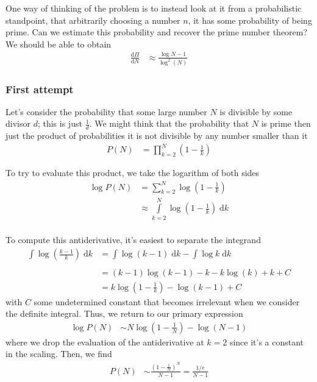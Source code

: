 \documentclass[10pt]{article}
\newcommand{\rd}[2]{\frac{\mathrm{d}#1}{\mathrm{d}#2}}
\begin{document}
One way of thinking of the problem is to instead look at it from a probabilistic
standpoint, that arbitrarily choosing a number $n$, it has some probability of
being prime. Can we estimate this probability and recover the prime number
theorem? We should be able to obtain
\begin{align}
    \rd{\Pi}{N} &\approx \frac{\log N - 1}{\log^2(N)}
\end{align}

\subsubsection{First attempt}

Let's consider the probability that some large number $N$ is divisible by some
divisor $d$; this is just $\frac{1}{d}$. We might think that the probability
that $N$ is prime then just the product of probabilities it is not divisible by
any number smaller than it
\begin{align}
    P(N) &= \prod_{k=2}^N \left( 1 - \frac{1}{k} \right)\label{2-prod}
\end{align}

To try to evaluate this product, we take the logarithm of both sides
\begin{align}
    \log P(N) &= \sum\limits_{k=2}^{N} \log \left( 1 - \frac{1}{k}
    \right)\\\label{2-intapprox}
    &\approx \int\limits_{k=2}^{N}\log \left( 1 - \frac{1}{k} \right)\;\mathrm{d}k\\
\end{align}

To compute this antiderivative, it's easiest to separate the integrand
\begin{align}
    \int\limits_{}^{}\log\left( \frac{k-1}{k} \right)\;\mathrm{d}k &=
    \int\limits_{}^{}\log (k-1)\;\mathrm{d}k - \int\limits_{}^{}\log
    k\;\mathrm{d}k\\
    &= (k-1)\log(k-1) - k - k\log(k) + k + C\\
    &= k\log\left( 1 - \frac{1}{k} \right) - \log(k-1) + C
\end{align}
with $C$ some undetermined constant that becomes irrelevant when we consider the
definite integral. Thus, we return to our primary expression
\begin{align}
    \log P(N) &\sim N\log\left( 1 - \frac{1}{N} \right) - \log(N - 1)
\end{align}
where we drop the evaluation of the antiderivative at $k=2$ since it's a
constant in the scaling. Then, we find
\begin{align}
    P(N) &\sim \frac{\left( 1 - \frac{1}{N} \right)^N}{N-1} =
    \frac{1/e}{N-1}
\end{align}
\end{document}
